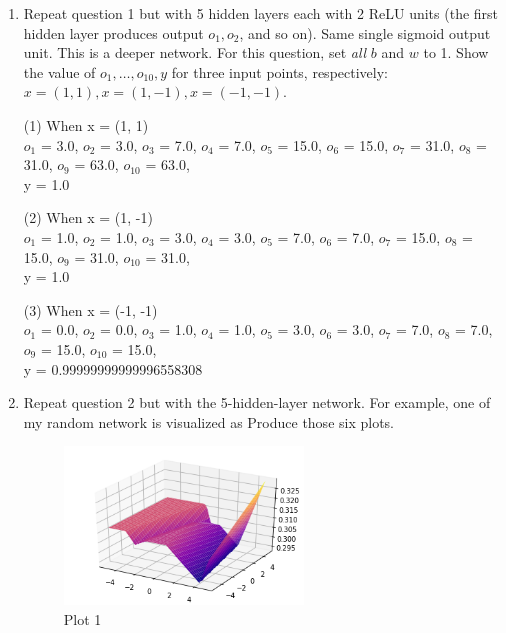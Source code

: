 \documentclass[a4paper]{article}
\theoremstyle{definition}
\def\y{\mathbf y}
\newenvironment{soln}{
    \leavevmode\color{blue}\ignorespaces
}{}
\begin{document}
\begin{enumerate}
\item Repeat question 1 but with 5 hidden layers each with 2 ReLU units (the first hidden layer produces output $o_1, o_2$, and so on).  Same single sigmoid output unit.  This is a deeper network.
For this question, set \emph{all} $b$ and $w$ to 1.
Show the value of $o_1, \ldots, o_{10}, y$ for three input points, respectively: $x=(1,1), x=(1, -1), x=(-1,-1)$.

\begin{soln}
(1) When x = (1, 1)
\\$o_1$ = 3.0, $o_2$ = 3.0, $o_3$ = 7.0, $o_4$ = 7.0, $o_5$ = 15.0, $o_6$ = 15.0, $o_7$ = 31.0, $o_8$ = 31.0, $o_9$ = 63.0, $o_{10}$ = 63.0, 
\\y = 1.0

(2) When x = (1, -1)
\\$o_1$ = 1.0, $o_2$ = 1.0, $o_3$ = 3.0, $o_4$ = 3.0, $o_5$ = 7.0, $o_6$ = 7.0, $o_7$ = 15.0, $o_8$ = 15.0, $o_9$ = 31.0, $o_{10}$ = 31.0, 
\\y = 1.0

(3) When x = (-1, -1)
\\$o_1$ = 0.0, $o_2$ = 0.0, $o_3$ = 1.0, $o_4$ = 1.0, $o_5$ = 3.0, $o_6$ = 3.0, $o_7$ = 7.0, $o_8$ = 7.0, $o_9$ = 15.0, $o_{10}$ = 15.0, 
\\y = 0.99999999999996558308

\end{soln}


\item Repeat question 2 but with the 5-hidden-layer network.
For example, one of my random network is visualized as
Produce those six plots.

\begin{soln}

\begin{figure}[h!]
	        \centering
	        \includegraphics[width=0.6\textwidth]{Q4/Img1.png} 
	        \captionsetup{labelformat=empty}
	        \caption{Plot 1}
\end{figure}


\end{soln}
\end{enumerate}
\end{document}
